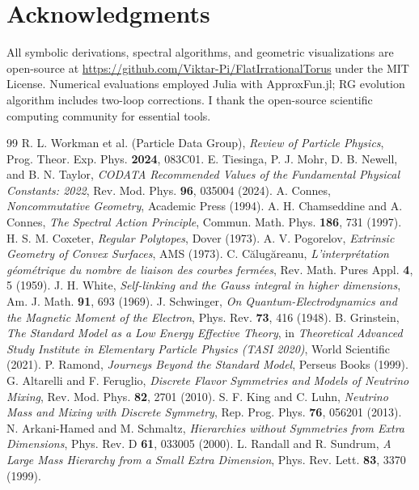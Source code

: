 \documentclass[12pt, a4paper]{article}
\theoremstyle{definition}
\begin{document}
\section*{Acknowledgments}
All symbolic derivations, spectral algorithms, and geometric visualizations are open-source at \url{https://github.com/Viktar-Pi/FlatIrrationalTorus} under the MIT License. Numerical evaluations employed Julia with ApproxFun.jl; RG evolution algorithm includes two-loop corrections. I thank the open-source scientific computing community for essential tools.

\begin{thebibliography}{99}
 R. L. Workman et al. (Particle Data Group), \textit{Review of Particle Physics}, Prog. Theor. Exp. Phys. \textbf{2024}, 083C01.
 E. Tiesinga, P. J. Mohr, D. B. Newell, and B. N. Taylor, \textit{CODATA Recommended Values of the Fundamental Physical Constants: 2022}, Rev. Mod. Phys. \textbf{96}, 035004 (2024).
 A. Connes, \textit{Noncommutative Geometry}, Academic Press (1994).
 A. H. Chamseddine and A. Connes, \textit{The Spectral Action Principle}, Commun. Math. Phys. \textbf{186}, 731 (1997).
 H. S. M. Coxeter, \textit{Regular Polytopes}, Dover (1973).
 A. V. Pogorelov, \textit{Extrinsic Geometry of Convex Surfaces}, AMS (1973).
 C. C\u{a}lug\u{a}reanu, \textit{L'interpr\'etation g\'eom\'etrique du nombre de liaison des courbes ferm\'ees}, Rev. Math. Pures Appl. \textbf{4}, 5 (1959).
 J. H. White, \textit{Self-linking and the Gauss integral in higher dimensions}, Am. J. Math. \textbf{91}, 693 (1969).
 J. Schwinger, \textit{On Quantum-Electrodynamics and the Magnetic Moment of the Electron}, Phys. Rev. \textbf{73}, 416 (1948).
 B. Grinstein, \textit{The Standard Model as a Low Energy Effective Theory}, in \textit{Theoretical Advanced Study Institute in Elementary Particle Physics (TASI 2020)}, World Scientific (2021).
 P. Ramond, \textit{Journeys Beyond the Standard Model}, Perseus Books (1999).
 G. Altarelli and F. Feruglio, \textit{Discrete Flavor Symmetries and Models of Neutrino Mixing}, Rev. Mod. Phys. \textbf{82}, 2701 (2010).
 S. F. King and C. Luhn, \textit{Neutrino Mass and Mixing with Discrete Symmetry}, Rep. Prog. Phys. \textbf{76}, 056201 (2013).
 N. Arkani-Hamed and M. Schmaltz, \textit{Hierarchies without Symmetries from Extra Dimensions}, Phys. Rev. D \textbf{61}, 033005 (2000).
 L. Randall and R. Sundrum, \textit{A Large Mass Hierarchy from a Small Extra Dimension}, Phys. Rev. Lett. \textbf{83}, 3370 (1999).
\end{thebibliography}
\end{document}

